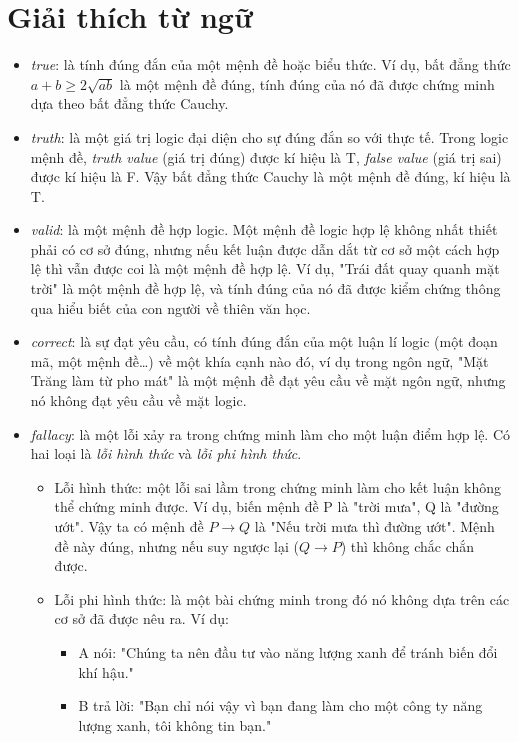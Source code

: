 \section*{Giải thích từ ngữ}
\begin{itemize}
    \item \textit{true}: là tính đúng đắn của một mệnh đề hoặc biểu thức. Ví dụ, bất đẳng thức $a+b\geq2\sqrt{ab}$ là một mệnh đề đúng, tính đúng của nó đã được chứng minh dựa theo bất đẳng thức Cauchy.
    \item \textit{truth}: là một giá trị logic đại diện cho sự đúng đắn so với thực tế. Trong logic mệnh đề, \textit{truth value} (giá trị đúng) được kí hiệu là T, \textit{false value} (giá trị sai) được kí hiệu là F. Vậy bất đẳng thức Cauchy là một mệnh đề đúng, kí hiệu là T.
    \item \textit{valid}: là một mệnh đề hợp logic. Một mệnh đề logic hợp lệ không nhất thiết phải có cơ sở đúng, nhưng nếu kết luận được dẫn dắt từ cơ sở một cách hợp lệ thì vẫn được coi là một mệnh đề hợp lệ. Ví dụ, "Trái đất quay quanh mặt trời" là một mệnh đề hợp lệ, và tính đúng của nó đã được kiểm chứng thông qua hiểu biết của con người về thiên văn học.
    \item \textit{correct}: là sự đạt yêu cầu, có tính đúng đắn của một luận lí logic (một đoạn mã, một mệnh đề\dots) về một khía cạnh nào đó, ví dụ trong ngôn ngữ, "Mặt Trăng làm từ pho mát" là một mệnh đề đạt yêu cầu về mặt ngôn ngữ, nhưng nó không đạt yêu cầu về mặt logic.
    \item \textit{fallacy}: là một lỗi xảy ra trong chứng minh làm cho một luận điểm hợp lệ. Có hai loại là \textit{lỗi hình thức} và \textit{lỗi phi hình thức}.
    \begin{itemize}
        \item Lỗi hình thức: một lỗi sai lầm trong chứng minh làm cho kết luận không thể chứng minh được. Ví dụ, biến mệnh đề P là "trời mưa", Q là "đường ướt". Vậy ta có mệnh đề $P\rightarrow Q$ là "Nếu trời mưa thì đường ướt". Mệnh đề này đúng, nhưng nếu suy ngược lại ($Q\rightarrow P$) thì không chắc chắn được.
        \item Lỗi phi hình thức: là một bài chứng minh trong đó nó không dựa trên các cơ sở đã được nêu ra. Ví dụ: \begin{itemize}
            \item A nói: "Chúng ta nên đầu tư vào năng lượng xanh để tránh biến đổi khí hậu."
            \item B trả lời: "Bạn chỉ nói vậy vì bạn đang làm cho một công ty năng lượng xanh, tôi không tin bạn."

\end{itemize}
\end{itemize}
\end{itemize}
